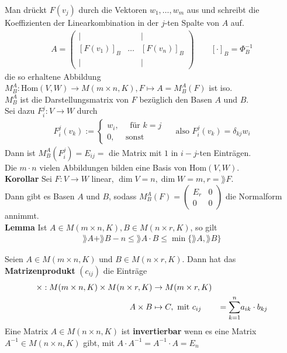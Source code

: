 Man drückt $F(v_j)$ durch die Vektoren $w_1, \ldots, w_m$ aus und schreibt die Koeffizienten der Linearkombination in der $j$-ten Spalte von $A$ auf.
\begin{align*}
    A = \begin{pmatrix}
    | &  & |\\
    [F(v_1)]_B & \ldots & [F(v_n)]_B\\
    | & & |
    \end{pmatrix}
    \qquad  [\cdot]_B = \Phi_B^{-1}
\end{align*}
die so erhaltene Abbildung $M_{B}^{A}: \text{Hom}(V,W) \rightarrow M(m\times n,K), F \mapsto A = M_{B}^{A}(F)$ ist iso.\\
$M_{B}^{A}$ ist die Darstellungsmatrix von $F$ bezüglich den Basen $A$ und $B$.\\
Sei dazu $F_{i}^{j}: V \rightarrow W$ durch 
\begin{align*}
    F_{i}^{j}(v_k) := \begin{cases}
        w_i, \quad \text{ für } k = j\\
        0, \quad \text{ sonst }
    \end{cases}
    \quad \text{ also } F_{i}^{j}(v_k)  = \delta_{kj} w_i
\end{align*}
Dann ist $M_{B}^{A}(F_{i}^{j}) = E_{ij} =$ die Matrix mit $1$ in $i-j$-ten Einträgen.\\
Die $m \cdot n$ vielen Abbildungen bilden eine Basis von $\text{Hom}(V,W)$.\\
\textbf{Korollar} Sei $F: V \rightarrow W$ linear, $\dim V = n, \dim W = m, r = \rang F$.\\
Dann gibt es Basen $A$ und $B$, sodass $M_{B}^{A}(F) = \begin{pmatrix}
    E_r & 0\\
    0 & 0
\end{pmatrix}$ die Normalform annimmt.\\
\textbf{Lemma} Ist $A \in M(m\times n,K), B \in M(n\times r,K)$, so gilt
\begin{align*}
    \rang A + \rang B -n \leq \rang A \cdot B \leq \min\{\rang A, \rang B\}
\end{align*}
\begin{mdframed}
Seien $A \in M(m\times n,K)$ und $B \in M(n\times r,K)$. Dann hat das \textbf{Matrizenprodukt} $(c_{ij})$ die Einträge
\begin{align*}
    \times: M(m\times n,K) \times M(n\times r,K) &\rightarrow M(m\times r,K)\\
    A \times B &\mapsto C, \text{ mit } c_{ij} &= \underset{k = 1}{\overset{n}{\sum}} a_{ik}\cdot b_{kj}
\end{align*}
Eine Matrix $A \in M(n\times n,K)$ ist \textbf{invertierbar} wenn es eine Matrix $A^{-1} \in M(n\times n,K)$ gibt, mit $A \cdot A^{-1} = A^{-1} \cdot A = E_n$
\end{mdframed}
